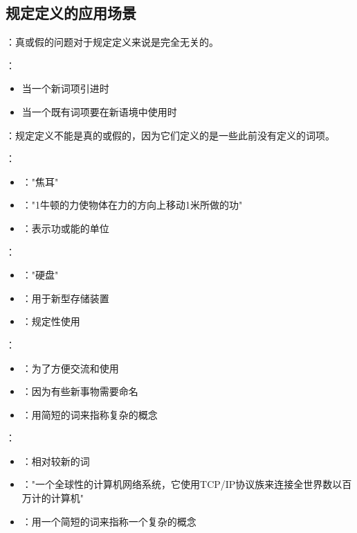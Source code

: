 \subsection{规定定义的应用场景}

\begin{theorembox}[title=规定定义的基本特征]
：真或假的问题对于规定定义来说是完全无关的。

：
\begin{itemize}
  \item 当一个新词项引进时
  \item 当一个既有词项要在新语境中使用时
\end{itemize}

：规定定义不能是真的或假的，因为它们定义的是一些此前没有定义的词项。
\end{theorembox}

\begin{examplebox}[title=规定定义的科学应用]
：
\begin{itemize}
  \item {}："焦耳"
  \item {}："1牛顿的力使物体在力的方向上移动1米所做的功"
  \item {}：表示功或能的单位
\end{itemize}

：
\begin{itemize}
  \item {}："硬盘"
  \item {}：用于新型存储装置
  \item {}：规定性使用
\end{itemize}
\end{examplebox}

\begin{theorembox}[title=规定定义的动机]
：
\begin{itemize}
  \item {}：为了方便交流和使用
  \item {}：因为有些新事物需要命名
  \item {}：用简短的词来指称复杂的概念
\end{itemize}
\end{theorembox}

\begin{examplebox}[title="因特网"的规定定义]
：
\begin{itemize}
  \item {}：相对较新的词
  \item {}："一个全球性的计算机网络系统，它使用TCP/IP协议族来连接全世界数以百万计的计算机"
  \item {}：用一个简短的词来指称一个复杂的概念
\end{itemize}
\end{examplebox}

